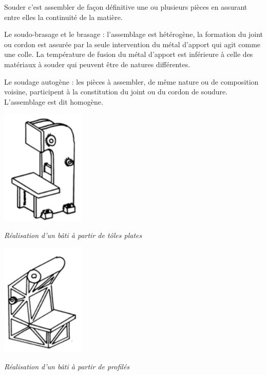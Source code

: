\documentclass[11pt,oneside]{article}
\begin{document}
Souder c'est assembler de façon définitive une ou plusieurs pièces en assurant entre elles la continuité de la matière. 

Le soudo-brasage et le brasage : l'assemblage est hétérogène, la formation du joint ou cordon est assurée par la seule intervention du métal d'apport qui agit comme une colle. La température de fusion du métal d'apport est inférieure à celle des matériaux à souder qui peuvent être de natures différentes.
	
Le soudage autogène : les pièces à assembler, de même nature ou de composition voisine, participent à la constitution du joint ou du cordon de soudure. L'assemblage est dit homogène.


\begin{minipage}[c]{.45\linewidth}
\begin{center}
\includegraphics[width=0.3\textwidth]{png/soudage1}

\textit{Réalisation d'un bâti à partir de tôles plates} 
\end{center}
\end{minipage}\hfill
\begin{minipage}[c]{.45\linewidth}
\begin{center}
\includegraphics[width=0.3\textwidth]{png/soudage2}

\textit{Réalisation d'un bâti à partir de profilés} 
\end{center}
\end{minipage}
\end{document}

